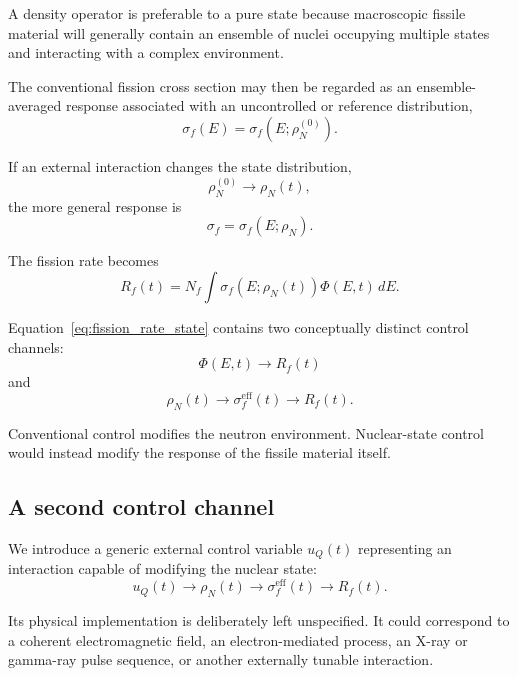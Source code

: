 A density operator is preferable to a pure state because macroscopic fissile material will generally contain an ensemble of nuclei occupying multiple states and interacting with a complex environment.

The conventional fission cross section may then be regarded as an ensemble-averaged response associated with an uncontrolled or reference distribution,
\begin{equation}
\sigma_f(E)
=
\sigma_f(E;\rho_N^{(0)}).
\end{equation}

If an external interaction changes the state distribution,
\begin{equation}
\rho_N^{(0)}
\rightarrow
\rho_N(t),
\end{equation}
the more general response is
\begin{equation}
\sigma_f
=
\sigma_f(E;\rho_N).
\end{equation}

The fission rate becomes
\begin{equation}
R_f(t)
=
N_f
\int
\sigma_f(E;\rho_N(t))
\Phi(E,t)\,dE.
\label{eq:fission_rate_state}
\end{equation}

Equation~\eqref{eq:fission_rate_state} contains two conceptually distinct control channels:
\begin{equation}
\Phi(E,t)
\rightarrow
R_f(t)
\end{equation}
and
\begin{equation}
\rho_N(t)
\rightarrow
\sigma_f^{\mathrm{eff}}(t)
\rightarrow
R_f(t).
\end{equation}

Conventional control modifies the neutron environment. Nuclear-state control would instead modify the response of the fissile material itself.

\subsection{A second control channel}

We introduce a generic external control variable $u_Q(t)$ representing an interaction capable of modifying the nuclear state:
\begin{equation}
u_Q(t)
\longrightarrow
\rho_N(t)
\longrightarrow
\sigma_f^{\mathrm{eff}}(t)
\longrightarrow
R_f(t).
\label{eq:q_control_chain}
\end{equation}

Its physical implementation is deliberately left unspecified. It could correspond to a coherent electromagnetic field, an electron-mediated process, an X-ray or gamma-ray pulse sequence, or another externally tunable interaction.

